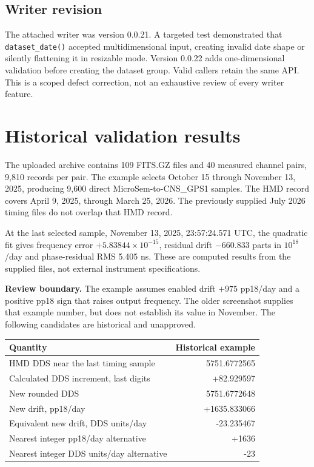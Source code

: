 \documentclass[11pt,a4paper]{article}
\newcommand{\warning}[1]{\par\noindent\colorbox{light}{\parbox{\dimexpr\linewidth-2\fboxsep}{\textbf{Review boundary.} #1}}\par}
\begin{document}
\subsection{Writer revision}
The attached writer was version 0.0.21. A targeted test demonstrated that
\texttt{dataset\_date()} accepted multidimensional input, creating invalid
date shape or silently flattening it in resizable mode. Version 0.0.22 adds
one-dimensional validation before creating the dataset group. Valid callers
retain the same API. This is a scoped defect correction, not an exhaustive
review of every writer feature.
\clearpage

\section{Historical validation results}
The uploaded archive contains 109 FITS.GZ files and 40 measured channel pairs,
9,810 records per pair. The example selects October 15 through November 13,
2025, producing 9,600 direct MicroSem-to-CNS\_GPS1 samples. The HMD record covers
April 9, 2025, through March 25, 2026. The previously supplied July 2026 timing
files do not overlap that HMD record.

At the last selected sample, November 13, 2025, 23:57:24.571 UTC, the quadratic
fit gives frequency error \(+5.83844\times10^{-15}\), residual drift
\(-660.833\) parts in \(10^{18}\)/day and phase-residual RMS 5.405 ns.
These are computed results from the supplied files, not external instrument
specifications.

\warning{The example assumes enabled drift \(+975\) pp18/day and a positive
pp18 sign that raises output frequency. The older screenshot supplies that
example number, but does not establish its value in November. The following
candidates are historical and unapproved.}

\begin{tabular}{@{}p{.49\linewidth}r@{}}
\toprule
Quantity & Historical example\\
\midrule
HMD DDS near the last timing sample & 5751.6772565\\
Calculated DDS increment, last digits & +82.929597\\
New rounded DDS & 5751.6772648\\
New drift, pp18/day & +1635.833066\\
Equivalent new drift, DDS units/day & -23.235467\\
Nearest integer pp18/day alternative & +1636\\
Nearest integer DDS units/day alternative & -23\\
\bottomrule
\end{tabular}
\end{document}
